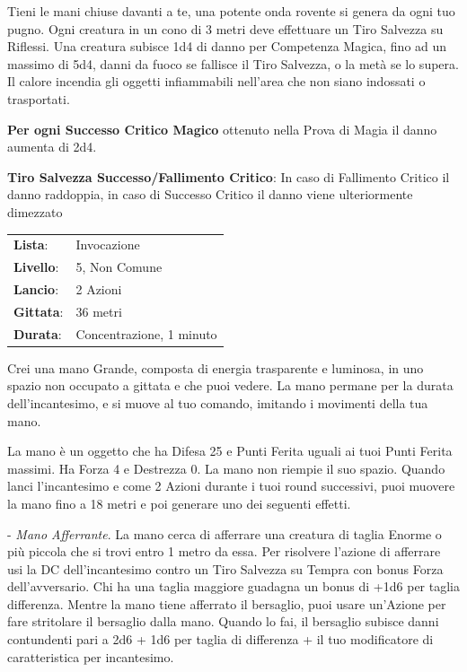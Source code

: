 \begin{multicols}{2}
Tieni le mani chiuse davanti a te, una potente onda rovente si genera da ogni tuo pugno. Ogni creatura in un cono di 3 metri deve effettuare un Tiro Salvezza su Riflessi. Una creatura subisce 1d4 di danno per Competenza Magica, fino ad un massimo di 5d4, danni da fuoco se fallisce il Tiro Salvezza, o la metà se lo supera. Il calore incendia gli oggetti infiammabili nell'area che non siano indossati o trasportati.

\textbf{Per ogni Successo Critico Magico} ottenuto nella Prova di Magia il danno aumenta di 2d4.

\textbf{Tiro Salvezza Successo/Fallimento Critico}: In caso di Fallimento Critico il danno raddoppia, in caso di Successo Critico il danno viene ulteriormente dimezzato

\noindent\begin{tabularx}{\linewidth}{p{1.3cm}X}
	\rowcolor{gray!20}\textbf{Lista}: & Invocazione \\
	\textbf{Livello}: & 5, Non Comune \\
	\rowcolor{gray!20}\textbf{Lancio}: & 2 Azioni \\
	\textbf{Gittata}: & 36 metri \\
	\rowcolor{gray!20}\textbf{Durata}: & Concentrazione, 1 minuto \\
\end{tabularx}\smallskip

Crei una mano Grande, composta di energia trasparente e luminosa, in uno spazio non occupato a gittata e che puoi vedere. La mano permane per la durata dell'incantesimo, e si muove al tuo comando, imitando i movimenti della tua mano.

La mano è un oggetto che ha Difesa 25 e Punti Ferita uguali ai tuoi Punti Ferita massimi. Ha Forza 4 e Destrezza 0. La mano non riempie il suo spazio.
Quando lanci l'incantesimo e come 2 Azioni durante i tuoi round successivi, puoi muovere la mano fino a 18 metri e poi generare uno dei seguenti effetti.

\medskip

- \emph{Mano Afferrante}. La mano cerca di afferrare una creatura di taglia Enorme o più piccola che si trovi entro 1 metro da essa. Per risolvere l'azione di afferrare usi la DC dell'incantesimo contro un Tiro Salvezza su Tempra con bonus Forza dell'avversario.
Chi ha una taglia maggiore guadagna un bonus di +1d6 per taglia differenza.
Mentre la mano tiene afferrato il bersaglio, puoi usare un'Azione per fare stritolare il bersaglio dalla mano. Quando lo fai, il bersaglio subisce danni contundenti pari a 2d6 + 1d6 per taglia di differenza + il tuo modificatore di caratteristica per incantesimo.


\end{multicols}
